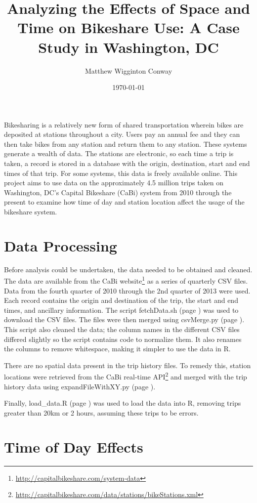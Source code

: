 \documentclass[letterpaper,11pt]{article}
\title{Analyzing the Effects of Space and Time on Bikeshare Use: A Case Study in Washington, DC}
\author{Matthew Wigginton Conway}
\date{\today}
\newcommand{\reflst}[1]{#1 (page \pageref{#1})}
\begin{document}
\maketitle

Bikesharing is a relatively new form of shared transportation wherein
bikes are deposited at stations throughout a city. Users pay an annual
fee and they can then take bikes from any station and return them to
any station. These systems generate a wealth of data. The stations are
electronic, so each time a trip is taken, a record is stored in a
database with the origin, destination, start and end times of that
trip. For some systems, this data is freely available online. This
project aims to use data on the approximately 4.5 million trips taken
on Washington, DC's Capital Bikeshare (CaBi) system from 2010 through the
present to examine how time of day and station location affect the
usage of the bikeshare system.

\section{Data Processing}

Before analysis could be undertaken, the data needed to be obtained and cleaned. 
The data are available from the CaBi website\footnote{\url{http://capitalbikeshare.com/system-data}}
as a series of quarterly CSV files. Data from the fourth quarter of 2010
through the 2nd quarter of 2013 were used. Each record contains the origin and
destination of the trip, the start and end times, and ancillary information.
The script \reflst{fetchData.sh} was used to download the CSV files. The files were then
merged using \reflst{csvMerge.py}. This script also cleaned the data; the column names in
the different CSV files differed slightly so the script contains code to normalize them.
It also renames the columns to remove whitespace, making it simpler to use the data in R.

There are no spatial data present in the trip history files. To remedy this,
station locations were retrieved from the CaBi real-time
API\footnote{\url{http://capitalbikeshare.com/data/stations/bikeStations.xml}}
and merged with the trip history data using \reflst{expandFileWithXY.py}.

Finally, \reflst{load_data.R} was used to load the data into R, removing trips greater than
20km or 2 hours, assuming these trips to be errors.

\section{Time of Day Effects}
\end{document}
